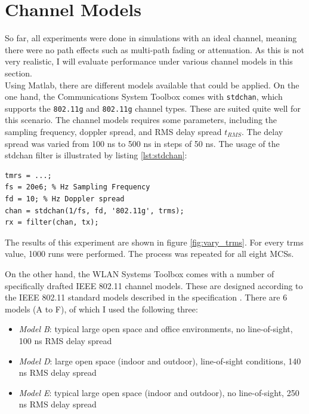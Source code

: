 
\section{Channel Models}

So far, all experiments were done in simulations with an ideal channel, meaning there were no path effects such as multi-path fading or attenuation. As this is not very realistic, I will evaluate performance under various channel models in this section.\\

Using Matlab, there are different models available that could be applied. On the one hand, the Communications System Toolbox comes with \texttt{stdchan}, which supports the \texttt{802.11g} and \texttt{802.11g} channel types. These are suited quite well for this scenario. The channel models requires some parameters, including the sampling frequency, doppler spread, and \gls{RMS} delay spread $ t_{RMS} $. The delay spread was varied from 100 ns to 500 ns in steps of 50 ns. The usage of the stdchan filter is illustrated by listing \ref{lst:stdchan}:

\begin{lstlisting}[captionpos=b,caption={Matlab stdchan Channel Model},label=lst:stdchan]
tmrs = ...;
fs = 20e6; % Hz Sampling Frequency
fd = 10; % Hz Doppler spread
chan = stdchan(1/fs, fd, '802.11g', trms);
rx = filter(chan, tx);
\end{lstlisting}

The results of this experiment are shown in figure \ref{fig:vary_trms}. For every trms value, 1000 runs were performed. The process was repeated for all eight \glspl{MCS}.

On the other hand, the WLAN Systems Toolbox comes with a number of specifically drafted IEEE 802.11 channel models. These are designed according to the IEEE 802.11 standard models described in the specification \cite{ieee2012}. There are 6 models (A to F), of which I used the following three:

\begin{itemize}
	\item \textit{Model B}: typical large open space and office environments, no line-of-sight, 100 ns RMS delay spread
	\item \textit{Model D}: large open space (indoor and outdoor), line-of-sight conditions, 140 ns RMS delay spread
	\item \textit{Model E}: typical large open space (indoor and outdoor), no line-of-sight, 250 ns RMS delay spread
\end{itemize}

